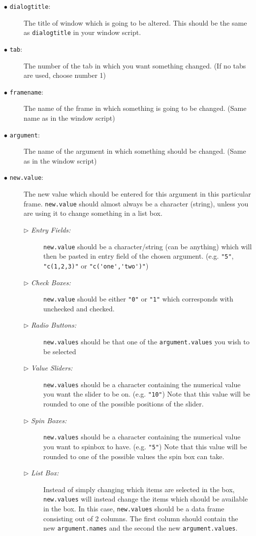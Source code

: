 \documentclass[a4paper]{article}\usepackage[]{graphicx}\usepackage[]{color}
\begin{document}
\begin{description}
  \item[$\bullet$ \texttt{dialogtitle}:] The title of window which is going to
  be altered. This should be the same as \verb|dialogtitle| in your window
  script.
  \item[$\bullet$ \texttt{tab}:] The number of the tab in which you want
  something changed. (If no tabs are used, choose number 1)
  \item[$\bullet$ \texttt{framename}:] The name of the frame in which something
  is going to be changed. (Same name as in the window script)
  \item[$\bullet$ \texttt{argument}:] The name of the argument in which
  something should be changed. (Same as in the window script)
  \item[$\bullet$ \texttt{new.value}:] The new value which should be entered for
  this argument in this particular frame. \verb|new.value| should almost always
  be a character (string), unless you are using it to change something in a list
  box.
  \begin{description}
    \item[$\triangleright$ {\it Entry Fields:}] \verb|new.value| should be a
    character/string (can be anything) which will then be pasted in entry field
    of the chosen argument. (e.g. \verb|"5"|, \verb|"c(1,2,3)"| or \verb|"c('one','two')"|)
    \item[$\triangleright$ {\it Check Boxes:}] \verb|new.value| should be
    either \verb|"0"| or \verb|"1"| which corresponds with unchecked and
    checked.
    \item[$\triangleright$ {\it Radio Buttons:}] \verb|new.values| should be
    that one of the \verb|argument.values| you wish to be selected
    \item[$\triangleright$ {\it Value Sliders:}] \verb|new.values| should be a
    character containing the numerical value you want the slider to be on. (e.g.
    \verb|"10"|) Note that this value will be rounded to one of the possible
    positions of the slider.
    \item[$\triangleright$ {\it Spin Boxes:}] \verb|new.values| should be a
    character containing the numerical value you want to spinbox to have. (e.g.
    \verb|"5"|) Note that this value will be rounded to one of the possible
    values the spin box can take.
    \item[$\triangleright$ {\it List Box:}] Instead of simply changing which
    items are selected in the box, \verb|new.values| will instead change the
    items which should be available in the box. In this case, \verb|new.values|
    should be a data frame consisting out of 2 columns. The first column should
    contain the new \verb|argument.names| and the second the new \verb|argument.values|.

  \end{description}
\end{description}
\end{document}
